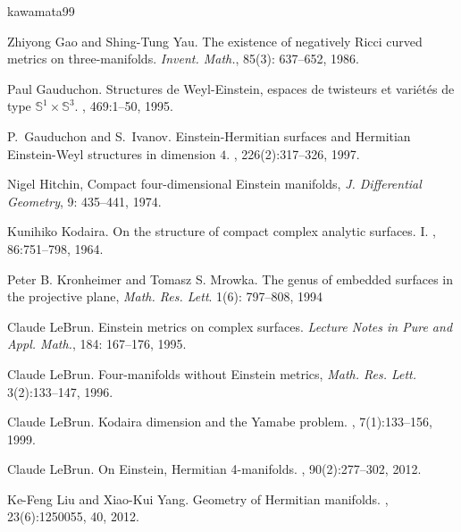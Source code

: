 \documentclass[12pt, reqno]{amsart} \usepackage{pifont} \usepackage{mathrsfs}
\theoremstyle{plain} \newtheorem{thm}{Theorem}[section]
\theoremstyle{definition} \newtheorem{example}[thm]{Example}
\renewcommand{\S}{{\mathbb S}} \newcommand{\Y}{{\mathbb Y}}
\renewcommand{\>}{\rightarrow}
\numberwithin{equation}{section} %
\begin{document}
\begin{thebibliography}{kawamata99}
		
		
		
		 Zhiyong Gao and Shing-Tung Yau.  The existence of
		negatively Ricci curved metrics on three-manifolds. \emph{Invent. Math.},
		85(3): 637--652, 1986.
		
		
		
		
		 Paul Gauduchon. \newblock Structures de
		{W}eyl-{E}instein, espaces de twisteurs et vari\'{e}t\'{e}s de type
		{$\S^1\times \S^3$}. , 469:1--50, 1995.
		
		 P.~Gauduchon and S.~Ivanov. \newblock
		Einstein-{H}ermitian surfaces and {H}ermitian {E}instein-{W}eyl structures in
		dimension {$4$}. , 226(2):317--326, 1997.
		
		
		
		 Nigel Hitchin, Compact four-dimensional Einstein
		manifolds, \emph{J. Differential Geometry},  9: 435--441, 1974.
		
		
		
		
		
		 Kunihiko Kodaira. \newblock On the structure of compact
		complex analytic surfaces. {I}. , 86:751--798,
		1964.
		
		Peter B. Kronheimer and Tomasz S. Mrowka. The genus of embedded surfaces in the projective plane, \emph{Math. Res. Lett}. 1(6): 797--808, 1994
		
		 Claude LeBrun.  Einstein metrics on complex
		surfaces.  \emph{Lecture Notes in Pure and Appl. Math.}, 184: 167--176, 1995.
		
		
		 Claude LeBrun. Four-manifolds without Einstein
		metrics, \emph{Math. Res. Lett.} 3(2):133--147, 1996.
		
		 Claude LeBrun. \newblock Kodaira dimension and the
		{Y}amabe problem. , 7(1):133--156, 1999.
		
		 Claude LeBrun. \newblock On {E}instein,
		{H}ermitian 4-manifolds. ,
		90(2):277--302, 2012.
		
		
		
		
		
		 Ke-Feng Liu and Xiao-Kui Yang. \newblock Geometry of
		{H}ermitian manifolds. , 23(6):1250055, 40,
		2012.
		

\end{thebibliography}
\end{document}
